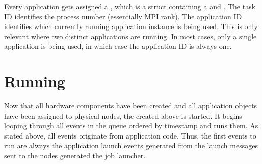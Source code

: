 Every application gets assigned a , which is a struct containing a  and .
The task ID identifies the process number (essentially MPI rank). 
The application ID identifies which currently running application instance is being used.
This is only relevant where two distinct applications are running.
In most cases, only a single application is being used, in which case the application ID is always one.


\section{Running}\label{sec:running}
Now that all hardware components have been created and all application objects have been assigned to physical nodes,
the  created above is started.
It begins looping through all events in the queue ordered by timestamp and runs them.
As stated above, all events originate from application code.
Thus, the first events to run are always the application launch events generated from the launch messages sent to the nodes generated the job launcher.


